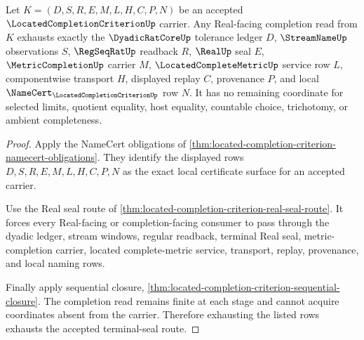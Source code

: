 \begin{theorem}
\label{thm:located-completion-criterion-terminal-seal-exhaustion}
Let $K=(D,S,R,E,M,L,H,C,P,N)$ be an accepted $\LocatedCompletionCriterionUp$ carrier. Any Real-facing completion read from $K$ exhausts exactly the $\DyadicRatCoreUp$ tolerance ledger $D$, $\StreamNameUp$ observations $S$, $\RegSeqRatUp$ readback $R$, $\RealUp$ seal $E$, $\MetricCompletionUp$ carrier $M$, $\LocatedCompleteMetricUp$ service row $L$, componentwise transport $H$, displayed replay $C$, provenance $P$, and local $\NameCert_{\LocatedCompletionCriterionUp}$ row $N$. It has no remaining coordinate for selected limits, quotient equality, host equality, countable choice, trichotomy, or ambient completeness.
\end{theorem}
\begin{proof}
Apply the NameCert obligations of \autoref{thm:located-completion-criterion-namecert-obligations}. They identify the displayed rows $D,S,R,E,M,L,H,C,P,N$ as the exact local certificate surface for an accepted carrier.

Use the Real seal route of \autoref{thm:located-completion-criterion-real-seal-route}. It forces every Real-facing or completion-facing consumer to pass through the dyadic ledger, stream windows, regular readback, terminal Real seal, metric-completion carrier, located complete-metric service, transport, replay, provenance, and local naming rows.

Finally apply sequential closure, \autoref{thm:located-completion-criterion-sequential-closure}. The completion read remains finite at each stage and cannot acquire coordinates absent from the carrier. Therefore exhausting the listed rows exhausts the accepted terminal-seal route.
\end{proof}



